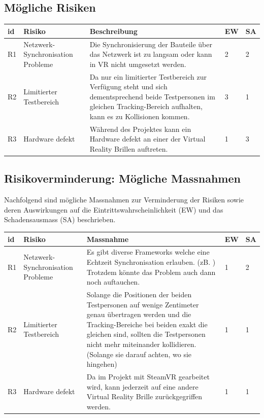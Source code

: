 \subsection{Mögliche Risiken}

\begin{center}
	\begin{tabularx}{\textwidth} { |l|B|B|l|l| }
		\hline
		\color{white} \textbf{id} & \color{white} \textbf{Risiko} & \color{white} \textbf{Beschreibung} & \color{white} \textbf{EW} & \color{white} \textbf{SA} \\
		\hline
		R1 & Netzwerk-Synchronisation Probleme & Die Synchronisierung der Bauteile über das Netzwerk ist zu langsam oder kann in VR nicht umgesetzt werden. & 2 & 2 \\
		\hline
		R2 & Limitierter Testbereich & Da nur ein limitierter Testbereich zur Verfügung steht und sich dementsprechend beide Testpersonen im gleichen Tracking-Bereich aufhalten, kann es zu Kollisionen kommen. & 3 & 1 \\
		\hline
		R3 & Hardware defekt & Während des Projektes kann ein Hardware defekt an einer der Virtual Reality Brillen auftreten. & 1 & 3 \\
		\hline
	\end{tabularx}
\end{center}
\label{tbl:risiken_vorher}

\subsection{Risikoverminderung: Mögliche Massnahmen}
Nachfolgend sind mögliche Massnahmen zur Verminderung der Risiken sowie deren Auswirkungen auf die Eintrittswahrscheinlichkeit (EW) und das Schadensausmass (SA) beschrieben.

\begin{center}
	\begin{tabularx}{\textwidth} { |l|B|B|l|l| }
		\hline
		\color{white} \textbf{id} & \color{white} \textbf{Risiko} & \color{white} \textbf{Massnahme} & \color{white} \textbf{EW} & \color{white} \textbf{SA} \\
		\hline
		R1 & Netzwerk-Synchronisation Probleme & Es gibt diverse Frameworks welche eine Echtzeit Synchronisation erlauben. (zB. \cite{noauthor_photon_2019}) Trotzdem könnte das Problem auch dann noch auftauchen. & 1 & 2 \\
		\hline
		R2 & Limitierter Testbereich & Solange die Positionen der beiden Testpersonen auf wenige Zentimeter genau übertragen werden und die Tracking-Bereiche bei beiden exakt die gleichen sind, sollten die Testpersonen nicht mehr miteinander kollidieren. (Solange sie darauf achten, wo sie hingehen)  & 1 & 1 \\
		\hline
		R3 & Hardware defekt & Da im Projekt mit SteamVR gearbeitet wird, kann jederzeit auf eine andere Virtual Reality Brille zurückgegriffen werden. & 1 & 1 \\
		\hline
	\end{tabularx}
\end{center}
\label{tbl:risiken_nachher}

